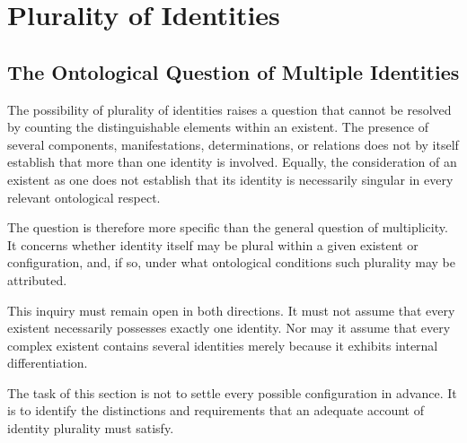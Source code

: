 %
%
%
%

\section{Plurality of Identities}
\label{sec:plurality-of-identities}

\subsection{The Ontological Question of Multiple Identities}

The possibility of plurality of identities raises a question
that cannot be resolved by counting the distinguishable elements
within an existent. The presence of several components,
manifestations, determinations, or relations does not by itself
establish that more than one identity is involved. Equally,
the consideration of an existent as one does not establish
that its identity is necessarily singular in every relevant
ontological respect.

The question is therefore more specific than the general
question of multiplicity. It concerns whether identity itself
may be plural within a given existent or configuration, and,
if so, under what ontological conditions such plurality may
be attributed.

This inquiry must remain open in both directions. It must
not assume that every existent necessarily possesses exactly
one identity. Nor may it assume that every complex existent
contains several identities merely because it exhibits
internal differentiation.

The task of this section is not to settle every possible
configuration in advance. It is to identify the distinctions
and requirements that an adequate account of identity plurality
must satisfy.

